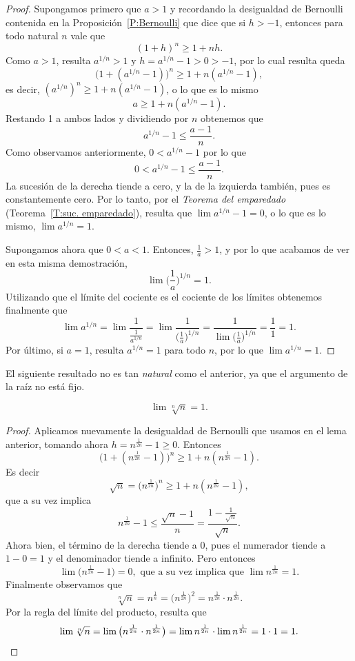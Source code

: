 \begin{proof}
Supongamos primero que $a > 1$ y recordando la desigualdad de Bernoulli contenida en la Proposición~\ref{P:Bernoulli} que dice que si $h>-1$, entonces para todo natural $n$ vale que
\[ 
(1+h)^n \ge 1 + n h.
\]
Como $a > 1$, resulta $a^{1/n} > 1$ y $h = a^{1/n}-1 > 0 > -1$, por lo cual resulta queda
\[
\big( 1 + (a^{1/n}-1)\big)^n \ge 1 + n (a^{1/n}-1),
\]
es decir, $(a^{1/n})^n \ge 1 + n (a^{1/n}-1)$, o lo que es lo mismo
\[
a \ge 1 + n (a^{1/n}-1).
\]
Restando 1 a ambos lados y dividiendo por $n$ obtenemos que
\[
a^{1/n}-1 \le \frac{a-1}n.
\]
Como observamos anteriormente, $0 < a^{1/n}-1$ por lo que 
\[
0 < a^{1/n}-1 \le \frac{a-1}n.
\]
La sucesión de la derecha tiende a cero, y la de la izquierda también, pues es constantemente cero. Por lo tanto, por el \emph{Teorema del emparedado} (Teorema~\ref{T:suc. emparedado}), resulta que $\lim a^{1/n} - 1 = 0$, o lo que es lo mismo, $\lim a^{1/n} = 1$.

Supongamos ahora que $0<a<1$. Entonces, $\frac1a>1$, y por lo que acabamos de ver en esta misma demostración, 
\[
\lim \Big(\frac1a\Big)^{1/n} = 1.
\]
Utilizando que el límite del cociente es el cociente de los límites obtenemos finalmente que
\[
    \lim a^{1/n} = 
    \lim \frac1{\frac1{a^{1/n}}} =
    \lim \frac1{\big(\frac1a\big)^{1/n} } = 
    \frac1{  \lim \big(\frac1a \big)^{1/n} } = \frac 1 1 = 1.
\]
Por último, si $a=1$, resulta $a^{1/n} = 1$ para todo $n$, por lo que $\lim a^{1/n}=1$.
\end{proof}

El siguiente resultado no es tan \emph{natural} como el anterior, ya que el argumento de la raíz no está fijo.

\begin{proposition}
    \[ \lim \sqrt[n]{n} = 1.\]
\end{proposition}

\begin{proof}
    Aplicamos nuevamente la desigualdad de Bernoulli que usamos en el lema anterior, tomando ahora $h = n^{\frac1{2n}}-1 \ge 0$. Entonces
    \[
    \big(1 + (n^{\frac1{2n}}-1)\big)^n \ge 1 + n(n^{\frac1{2n}}-1).
    \]
    Es decir
    \[
    \sqrt{n} =  \big(n^{\frac1{2n}}\big)^n \ge 1 + n(n^{\frac1{2n}}-1),
    \]
    que a su vez implica
    \[
    n^{\frac1{2n}} - 1 \le \frac{\sqrt n-1}n = \frac{1-\frac1{\sqrt n}}{\sqrt n}.
    \]
    Ahora bien, el término de la derecha tiende a $0$, pues el numerador tiende a $1-0=1$ y el denominador tiende a infinito. Pero entonces 
    \[ 
    \lim \big(n^{\frac1{2n}} - 1\big) = 0, \text{ que a su vez implica que }
    \lim n^{\frac1{2n}} = 1.
    \]
    Finalmente observamos que 
    \[
    \sqrt[n]{n} = n^{\frac1n} = \big(n^{\frac1{2n}}\big)^2 = n^{\frac1{2n}} \cdot n^{\frac1{2n}}.
    \]
    Por la regla del límite del producto, resulta que
    \[
    \lim \sqrt[n]{n} = \lim \big(n^{\frac1{2n}} \cdot n^{\frac1{2n}}\big) 
    = \lim n^{\frac1{2n}} \cdot \lim n^{\frac1{2n}} = 1 \cdot 1 = 1.
    \qedhere\]
\end{proof}

